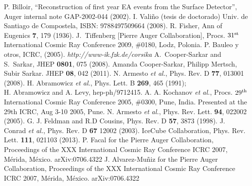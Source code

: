 \begin{thebibliography}{1}
 P. Billoir, ``Reconstruction of first year EA events from the Surface Detector'', Auger internal note GAP-2002-044 (2002).
 I. Vali\~no (tesis de doctorado) Univ. de Santiago de Compostela, ISBN: 9788497509664 (2008).
 R. Fisher, Ann of Eugenics {\bf7}, 179 (1936).
 J.~Tiffenberg [Pierre Auger Collaboration], Procs. $31^{\rm st}$ International Cosmic Ray Conference 2009, $\#$0180, Lodz, Polonia.
 P. Bauleo y otros, ICRC, (2005).
 \emph{http://www-ik.fzk.de/corsika}
 A.~Cooper-Sarkar and S.~Sarkar, JHEP {\bf 0801}, 075 (2008).
Amanda Cooper-Sarkar, Philipp Mertsch, Subir Sarkar. JHEP \textbf{08}, 042 (2011).
 N. Armesto {\it et al.}, Phys. Rev. D \textbf{77}, 013001 (2008).
 H. Abramowicz {\it et al.}, Phys. Lett. B \textbf{269}, 465  (1991);\\ H. Abramowicz and A. Levy, hep-ph/9712415. A. A. Kochanov {\it et al.}, Procs. $29^{\rm th}$ International Cosmic Ray Conference 2005, $\#$0300, Pune, India. Presented at the 29th ICRC, Aug 3-10 2005, Pune.
 N. Armesto {\it et al.}, Phys. Rev. Lett. \textbf{94}, 022002 (2005).
 G. J. Feldman and R.D Cousins, Phys. Rev. D \textbf{57}, 3873 (1998).
 J. Conrad {\it et al.}, Phys. Rev. D \textbf{67} 12002 (2003).
 IceCube Collaboration, Phys. Rev. Lett. \textbf{111}, 021103 (2013).
 P. Facal for the Pierre Auger Collaboration, Proceedings of the XXX International Cosmic Ray Conference ICRC 2007, M\'erida, M\'exico. arXiv:0706.4322
 J. Alvarez-Mu\~niz for the Pierre Auger Collaboration, Proceedings of the XXX International Cosmic Ray Conference ICRC 2007, M\'erida, M\'exico. arXiv:0706.4322

\end{thebibliography}
